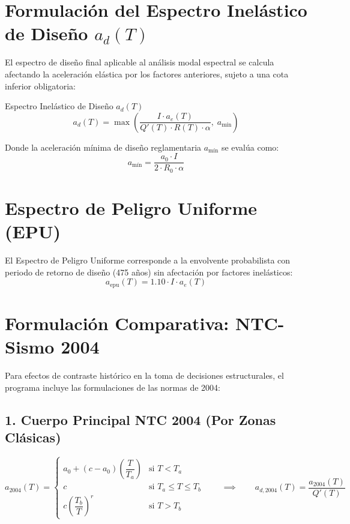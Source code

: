 \documentclass[11pt,a4paper]{article}
\begin{document}
\vspace{0.2cm}

\section{Formulación del Espectro Inelástico de Diseño $a_d(T)$}
El espectro de diseño final aplicable al análisis modal espectral se calcula afectando la aceleración elástica por los factores anteriores, sujeto a una cota inferior obligatoria:

\begin{formulabox}{Espectro Inelástico de Diseño $a_d(T)$}
$$
a_d(T) = \max \left( \frac{I \cdot a_e(T)}{Q'(T) \cdot R(T) \cdot \alpha}, \; a_{\text{mín}} \right)
$$
\end{formulabox}

Donde la aceleración mínima de diseño reglamentaria $a_{\text{mín}}$ se evalúa como:
\begin{equation}
a_{\text{mín}} = \frac{a_0 \cdot I}{2 \cdot R_0 \cdot \alpha}
\end{equation}

\vspace{0.2cm}

\section{Espectro de Peligro Uniforme (EPU)}
El Espectro de Peligro Uniforme corresponde a la envolvente probabilista con periodo de retorno de diseño (475 años) sin afectación por factores inelásticos:
\begin{equation}
a_{\text{epu}}(T) = 1.10 \cdot I \cdot a_e(T)
\end{equation}

\newpage

\section{Formulación Comparativa: NTC-Sismo 2004}
Para efectos de contraste histórico en la toma de decisiones estructurales, el programa incluye las formulaciones de las normas de 2004:

\subsection{1. Cuerpo Principal NTC 2004 (Por Zonas Clásicas)}
$$
a_{2004}(T) = 
\begin{cases} 
a_0 + (c - a_0) \left(\dfrac{T}{T_a}\right) & \text{si } T < T_a \\[6pt]
c & \text{si } T_a \le T \le T_b \\[6pt]
c \left(\dfrac{T_b}{T}\right)^r & \text{si } T > T_b 
\end{cases}
\qquad \implies \qquad
a_{d,2004}(T) = \frac{a_{2004}(T)}{Q'(T)}
$$
\end{document}
